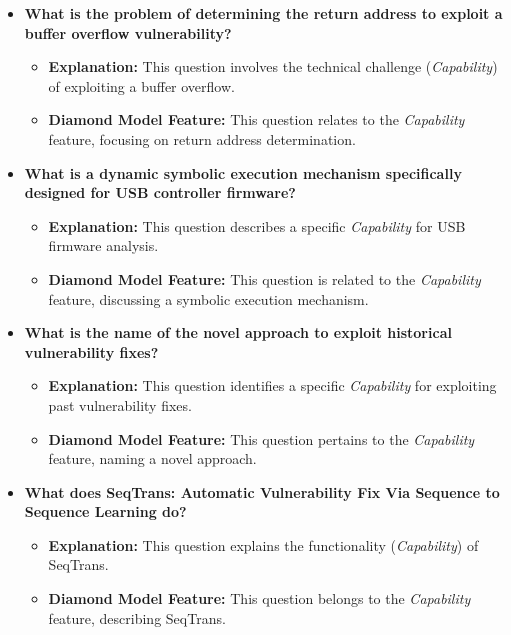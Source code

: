 \documentclass{article}
\begin{document}
\begin{itemize}
    \item \textbf{What is the problem of determining the return address to exploit a buffer overflow vulnerability?}
    \begin{itemize}
        \item \textbf{Explanation:} This question involves the technical challenge (\textit{Capability}) of exploiting a buffer overflow.
        \item \textbf{Diamond Model Feature:} This question relates to the \textit{Capability} feature, focusing on return address determination.
    \end{itemize}

    \item \textbf{What is a dynamic symbolic execution mechanism specifically designed for USB controller firmware?}
    \begin{itemize}
        \item \textbf{Explanation:} This question describes a specific \textit{Capability} for USB firmware analysis.
        \item \textbf{Diamond Model Feature:} This question is related to the \textit{Capability} feature, discussing a symbolic execution mechanism.
    \end{itemize}

    \item \textbf{What is the name of the novel approach to exploit historical vulnerability fixes?}
    \begin{itemize}
        \item \textbf{Explanation:} This question identifies a specific \textit{Capability} for exploiting past vulnerability fixes.
        \item \textbf{Diamond Model Feature:} This question pertains to the \textit{Capability} feature, naming a novel approach.
    \end{itemize}

    \item \textbf{What does SeqTrans: Automatic Vulnerability Fix Via Sequence to Sequence Learning do?}
    \begin{itemize}
        \item \textbf{Explanation:} This question explains the functionality (\textit{Capability}) of SeqTrans.
        \item \textbf{Diamond Model Feature:} This question belongs to the \textit{Capability} feature, describing SeqTrans.
    \end{itemize}


\end{itemize}
\end{document}
